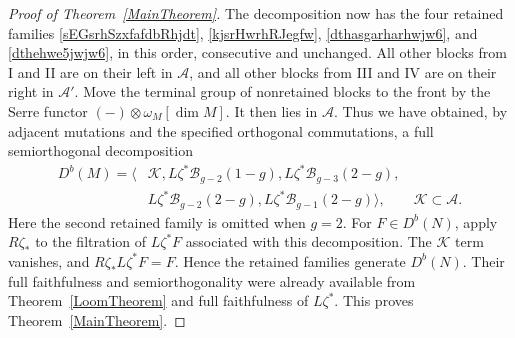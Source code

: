 \documentclass[10pt,a4paper]{amsart}
\begin{document}
\begin{proof}[Proof of Theorem~\ref{MainTheorem}]
The decomposition now has the four retained families
\eqref{sEGsrhSzxfafdbRhjdt}, \eqref{kjsrHwrhRJegfw},
\eqref{dthasgarharhwjw6}, and \eqref{dthehwe5jwjw6}, in this order,
consecutive and unchanged.  All other blocks from I and II are on
their left in $\mathcal A$, and all other blocks from III and IV
are on their right in $\mathcal A'$.
Move the terminal group of nonretained blocks to the front by the Serre functor
$(-)\otimes\omega_M[\dim M]$.  It then lies in $\mathcal A$.
Thus we have obtained, by adjacent mutations and the specified
orthogonal commutations, a full semiorthogonal decomposition
\[
 \begin{aligned}
 D^b(M)=\bigl\langle &\mathcal K,
 L\zeta^*\mathcal B_{g-2}(1-g),
 L\zeta^*\mathcal B_{g-3}(2-g),\\
 &L\zeta^*\mathcal B_{g-2}(2-g),
 L\zeta^*\mathcal B_{g-1}(2-g)\bigr\rangle,
 \qquad \mathcal K\subset\mathcal A.
 \end{aligned}
\]
Here the second retained family is omitted when $g=2$.
For $F\in D^b(N)$, apply $R\zeta_*$ to the filtration of
$L\zeta^*F$ associated with this decomposition.  The $\mathcal K$
term vanishes, and $R\zeta_*L\zeta^*F=F$.
Hence the retained families generate $D^b(N)$.
Their full faithfulness and semiorthogonality were already available
from Theorem~\ref{LoomTheorem} and full faithfulness of $L\zeta^*$.
This proves Theorem~\ref{MainTheorem}.
\end{proof}
\end{document}
